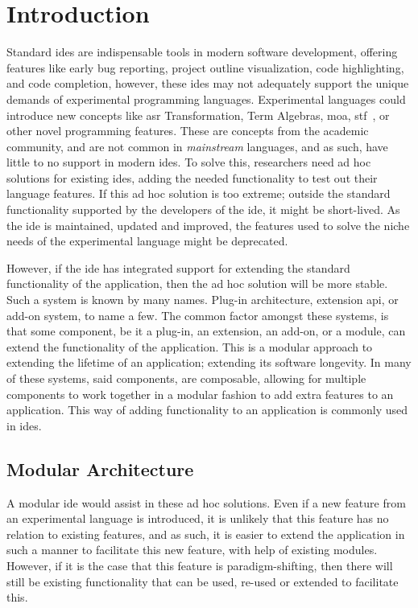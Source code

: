 \chapter{Introduction}

Standard \gls*{ide}s are indispensable tools in modern software development,
offering features like early bug reporting, project outline visualization, code
highlighting, and code completion, however, these \gls*{ide}s may not adequately
support the unique demands of experimental programming languages. Experimental
languages could introduce new concepts like \gls*{asr} Transformation, Term
Algebras, \gls*{moa}, \gls*{stf}~\cite{stf:haveraaen:2020}, or other novel
programming features. These are concepts from the academic community, and are
not common in \textit{mainstream} languages, and as such, have little to no
support in modern \gls*{ide}s. To solve this, researchers need ad hoc solutions
for existing \gls*{ide}s, adding the needed functionality to test out their
language features. If this ad hoc solution is too extreme; outside the standard
functionality supported by the developers of the \gls*{ide}, it might be
short-lived. As the \gls*{ide} is maintained, updated and improved, the features
used to solve the niche needs of the experimental language might be deprecated.

However, if the \gls*{ide} has integrated support for extending the standard
functionality of the application, then the ad hoc solution will be more stable.
Such a system is known by many names. Plug-in architecture, extension \gls*{api},
or add-on system, to name a few. The common factor amongst these systems, is
that some component, be it a plug-in, an extension, an add-on, or a module, can
extend the functionality of the application. This is a modular approach to
extending the lifetime of an application; extending its software longevity. In
many of these systems, said components, are composable, allowing for multiple
components to work together in a modular fashion to add extra features to an
application. This way of adding functionality to an application is commonly used
in \gls*{ide}s.


\section{Modular Architecture}

A modular \gls*{ide} would assist in these ad hoc solutions. Even if a new
feature from an experimental language is introduced, it is unlikely that this
feature has no relation to existing features, and as such, it is easier to
extend the application in such a manner to facilitate this new feature, with help of
existing modules. However, if it is the case that this feature is
paradigm-shifting, then there will still be existing functionality that can be
used, re-used or extended to facilitate this.

